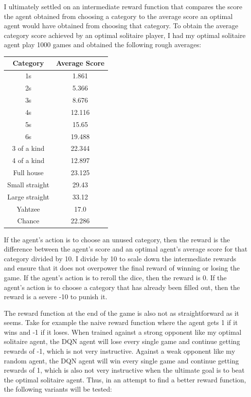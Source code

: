 \documentclass[12pt]{article}
\begin{document}
I ultimately settled on an intermediate reward function that compares the score the agent obtained from choosing a category to the average score an optimal agent would have obtained from choosing that category. To obtain the average category score achieved by an optimal solitaire player, I had my optimal solitaire agent play 1000 games and obtained the following rough averages:

\begin{center}
    \begin{tabular}{ |c|c| }
        \hline
        Category & Average Score \\
        \hline
        1s & 1.861 \\
        2s & 5.366 \\
        3s & 8.676 \\
        4s & 12.116 \\
        5s & 15.65 \\
        6s & 19.488 \\
        3 of a kind & 22.344 \\
        4 of a kind & 12.897 \\
        Full house & 23.125 \\
        Small straight & 29.43 \\
        Large straight & 33.12 \\
        Yahtzee & 17.0 \\
        Chance & 22.286 \\
        \hline
    \end{tabular}
\end{center} 

\noindent
If the agent's action is to choose an unused category, then the reward is the difference between the agent's score and an optimal agent's average score for that category divided by 10. I divide by 10 to scale down the intermediate rewards and ensure that it does not overpower the final reward of winning or losing the game. If the agent's action is to reroll the dice, then the reward is 0. If the agent's action is to choose a category that has already been filled out, then the reward is a severe -10 to punish it.

The reward function at the end of the game is also not as straightforward as it seems. Take for example the naive reward function where the agent gets 1 if it wins and -1 if it loses. When trained against a strong opponent like my optimal solitaire agent, the DQN agent will lose every single game and continue getting rewards of -1, which is not very instructive. Against a weak opponent like my random agent, the DQN agent will win every single game and continue getting rewards of 1, which is also not very instructive when the ultimate goal is to beat the optimal solitaire agent. Thus, in an attempt to find a better reward function, the following variants will be tested:
\end{document}
